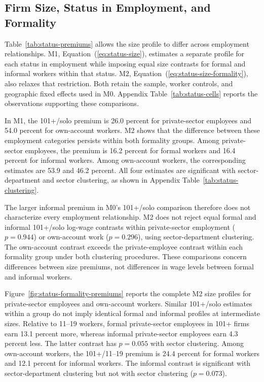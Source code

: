 \subsection{Firm Size, Status in Employment, and Formality}
\label{subsec:status-results}

Table~\ref{tab:status-premiums} allows the size profile to differ across
employment relationships. M1, Equation~(\ref{eq:status-size}), estimates a
separate profile for each status in employment while imposing equal size
contrasts for formal and informal workers within that status. M2,
Equation~(\ref{eq:status-size-formality}), also relaxes that restriction.
Both retain the sample, worker controls, and geographic fixed effects used
in M0. Appendix Table~\ref{tab:status-cells} reports the observations
supporting these comparisons.



In M1, the 101+/solo premium is 26.0 percent for private-sector employees
and 54.0 percent for own-account workers. M2 shows that the difference
between these employment categories persists within both formality groups.
Among private-sector employees, the premium is 16.2 percent for formal
workers and 16.4 percent for informal workers. Among own-account workers,
the corresponding estimates are 53.9 and 46.2 percent. All four estimates
are significant with sector-department and sector clustering, as shown in
Appendix Table~\ref{tab:status-clustering}.

The larger informal premium in M0's 101+/solo comparison therefore does
not characterize every employment relationship. M2 does not reject equal
formal and informal 101+/solo log-wage contrasts within private-sector
employment ($p=0.944$) or own-account work ($p=0.296$), using
sector-department clustering. The own-account contrast exceeds the
private-employee contrast within each formality group under both clustering
procedures. These comparisons concern differences between size premiums,
not differences in wage levels between formal and informal workers.

Figure~\ref{fig:status-formality-premiums} reports the complete M2 size
profiles for private-sector employees and own-account workers. Similar
101+/solo estimates within a group do not imply identical formal and
informal profiles at intermediate sizes. Relative to 11--19 workers, formal
private-sector employees in 101+ firms earn 13.1 percent more, whereas
informal private-sector employees earn 4.3 percent less. The latter contrast
has $p=0.055$ with sector clustering. Among own-account workers, the
101+/11--19 premium is 24.4 percent for formal workers and 12.1 percent for
informal workers. The informal contrast is significant with
sector-department clustering but not with sector clustering ($p=0.073$).

